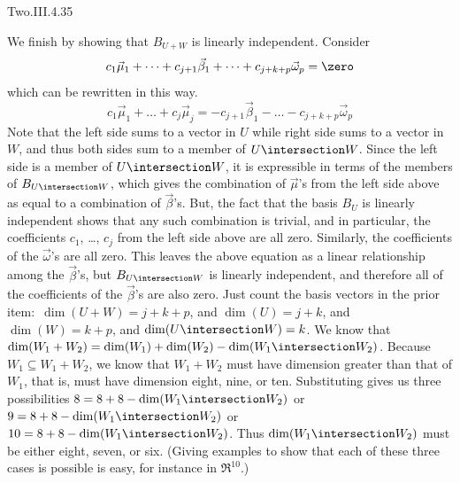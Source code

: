 \begin{ans}{Two.III.4.35}
\begin{exparts}
         We finish by showing that $B_{U+W}$ is linearly independent.
         Consider
         \begin{equation*}
           c_1\vec{\mu}_1+\dots+c_{j+1}\vec{\beta}_1+\dots
              +c_{j+k+p}\vec{\omega}_p=\zero
         \end{equation*}
         which can be rewritten in this way.
         \begin{equation*}
           c_1\vec{\mu}_1+\dots+c_j\vec{\mu}_j=
             -c_{j+1}\vec{\beta}_1-\dots-c_{j+k+p}\vec{\omega}_p
         \end{equation*}
         Note that the left side sums to a vector in \( U \) while
         right side sums to a vector in \( W \), and thus both sides sum to
         a member of $U\intersection W$.
         Since the left side is a member of $U\intersection W$,
         it is expressible in terms of the members of $B_{U\intersection W}$,
         which gives the combination of $\vec{\mu}$'s from the left side above
         as equal to a combination of $\vec{\beta}$'s.
         But, the fact that
         the basis $B_U$ is linearly independent shows
         that any such combination
         is trivial, and in particular, the coefficients $c_1$, \ldots,
         $c_j$ from the left side above are all zero.
         Similarly, the coefficients of the \( \vec{\omega} \)'s are all zero.
         This leaves the above equation as a linear relationship among the
         \( \vec{\beta} \)'s,
         but $B_{U\intersection W}$ is linearly independent,
         and therefore all of the coefficients of the $\vec{\beta}$'s are also
         zero.
        \partsitem Just count the basis vectors in the prior
          item:~$\dim(U+W)=j+k+p$, and $\dim(U)=j+k$, and $\dim(W)=k+p$,
          and $\dim(U\intersection W)=k$.
        \partsitem  We know that
          \( \dim(W_1+W_2)=\dim(W_1)+\dim(W_2)-\dim(W_1\intersection W_2) \).
          Because \( W_1\subseteq W_1+W_2 \),
          we know that \( W_1+W_2 \) must have dimension greater than that of
          $W_1$, that is, must have dimension eight, nine, or ten.
          Substituting gives us three possibilities
          $8=8+8-\dim(W_1\intersection W_2)$ or
          $9=8+8-\dim(W_1\intersection W_2)$ or
          $10=8+8-\dim(W_1\intersection W_2)$.
          Thus \( \dim(W_1\intersection W_2) \) must be either
          eight, seven, or six.
          (Giving examples to show that
          each of these three cases is possible
          is easy, for instance in \( \Re^{10} \).)
      \end{exparts}
    
\end{ans}
